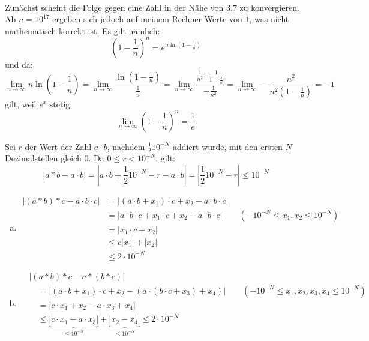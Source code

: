 \documentclass{mywork}
\begin{document}
\setcounter{aufgabe}{0}

\begin{aufgabe}~

	Zunächst scheint die Folge gegen eine Zahl in der Nähe von $3.7$ zu konvergieren.
	Ab $n=10^{17}$ ergeben sich jedoch auf meinem Rechner Werte von $1$, was nicht mathematisch korrekt ist.
Es gilt nämlich:
\[
\left(1-\frac 1n\right)^n=e^{n\ln\left(1-\frac 1n\right)}
\]
und da:
\[
\lim_{n\to\infty}n\ln\left(1-\frac 1n\right)
=\lim_{n\to\infty}\frac{\ln\left(1-\frac 1n\right)}{\frac 1n}
=\lim_{n\to\infty}\frac{\frac 1{n^2}\cdot\frac 1{1-\frac 1n}}{-\frac 1{n^2}}
=\lim_{n\to\infty}-\frac{n^2}{n^2\left(1-\frac 1n\right)}
=-1
\]
gilt, weil $e^x$ stetig:
\[
\lim_{n\to\infty}\left(1-\frac 1n\right)^n=\frac 1e
\]

\end{aufgabe}

\begin{aufgabe}
\begin{lem*}
Sei $r$ der Wert der Zahl $a\cdot b$, nachdem $\frac 12 10^{-N}$ addiert wurde, mit den ersten $N$ Dezimalstellen gleich $0$.
Da $0\le r<10^{-N}$, gilt:
\[
\left|a\ast b-a\cdot b\right|
=\left|a\cdot b + \frac 12 10^{-N} - r -a\cdot b\right|
=\left|\frac 12 10^{-N}-r\right|
\le 10^{-N}
\]
\end{lem*}
\begin{enumerate}[a)]
\item
\begin{align*}
\left| (a\ast b)\ast c - a\cdot b\cdot c\right|
&= \left| (a\cdot b+x_1)\cdot c + x_2 - a\cdot b\cdot c\right|\\
&=\left| a\cdot b\cdot c +x_1\cdot c+x_2-a \cdot b\cdot c\right| \qquad (-10^{-N}\le x_1,x_2\le 10^{-N})\\
&=\left| x_1\cdot c+x_2\right|\\
&\le c|x_1|+|x_2|\\
&\le 2\cdot 10^{-N}
\end{align*}
\item
\begin{align*}
&\left|(a\ast b)\ast c - a\ast(b\ast c)\right|\\
&\quad =\left|(a\cdot b+x_1)\cdot c+x_2-(a\cdot(b\cdot c + x_3)+x_4)\right| \qquad (-10^{-N}\le x_1,x_2,x_3,x_4\le 10^{-N})\\
&\quad =\left|c\cdot x_1+x_2-a\cdot x_3+x_4\right|\\
&\quad \le\underbrace{\left|c\cdot x_1-a\cdot x_3\right|}_{\le 10^{-N}} + \underbrace{\left|x_2-x_4\right|}_{\le 10^{-N}}
\le 2\cdot 10^{-N}
\end{align*}
\end{enumerate}
\end{aufgabe}
\end{document}
